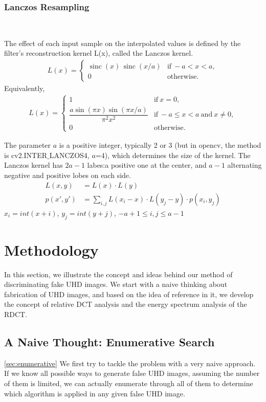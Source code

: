 \documentclass[journal,conference]{IEEEtran}
\begin{document}
\subsubsection{Lanczos Resampling}
~\\
\par The effect of each input sample on the interpolated values is defined by the filter's reconstruction kernel L(x), called the Lanczos kernel. 
\begin{align*}
{\displaystyle L(x)={\begin{cases}\operatorname {sinc} (x)\,\operatorname {sinc} (x/a)&{\text{if}}\ -a<x<a,\\0&{\text{otherwise}}.\end{cases}}}
\end{align*}
Equivalently,
\begin{align*}
{\displaystyle L(x)={\begin{cases}1&{\text{if}}\ x=0,\\{\dfrac {a\sin(\pi x)\sin(\pi x/a)}{\pi ^{2}x^{2}}}&{\text{if}}\ -a\leq x<a\ {\text{and}}\ x\neq 0,\\0&{\text{otherwise}}.\end{cases}}}
\end{align*}
\par The parameter $a$ is a positive integer, typically 2 or 3 (but in opencv, the method is cv2.INTER$\_$LANCZOS4, $a$=4), which determines the size of the kernel. The Lanczos kernel has $2a-1$ labes:a positive one at the center, and $a-1$ alternating negative and positive lobes on each side.
\begin{align*}
L(x,y) &= L(x) \cdot L(y)\\
p(x',y') &= \sum_{i,j}{L(x_i-x)\cdot L(y_j-y)\cdot p(x_i,y_j)}
\end{align*}
$x_i=int(x+i)$, $y_j=int(y+j)$, $-a+1\leq i, j \leq a-1$

\section{Methodology}
In this section, we illustrate the concept and ideas behind our method of discriminating fake UHD images.
We start with a naive thinking about fabrication of UHD images, and based on the idea of reference in it, we develop the concept of relative DCT analysis and the energy spectrum analysis of the RDCT.


\subsection{A Naive Thought: Enumerative Search}
\cref{sec:enumerative}
We first try to tackle the problem with a very naive approach.
If we know all possible ways to generate false UHD images, assuming the number of them is limited, we can actually enumerate through all of them to determine which algorithm is applied in any given false UHD image.
\end{document}
